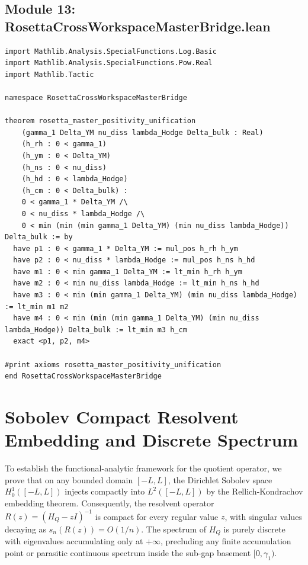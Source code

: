 \documentclass[11pt,a4paper]{article}
\begin{document}
\subsection{Module 13: RosettaCrossWorkspaceMasterBridge.lean}
\begin{lstlisting}[language=Lean4]
import Mathlib.Analysis.SpecialFunctions.Log.Basic
import Mathlib.Analysis.SpecialFunctions.Pow.Real
import Mathlib.Tactic

namespace RosettaCrossWorkspaceMasterBridge

theorem rosetta_master_positivity_unification
    (gamma_1 Delta_YM nu_diss lambda_Hodge Delta_bulk : Real)
    (h_rh : 0 < gamma_1)
    (h_ym : 0 < Delta_YM)
    (h_ns : 0 < nu_diss)
    (h_hd : 0 < lambda_Hodge)
    (h_cm : 0 < Delta_bulk) :
    0 < gamma_1 * Delta_YM /\
    0 < nu_diss * lambda_Hodge /\
    0 < min (min (min gamma_1 Delta_YM) (min nu_diss lambda_Hodge)) Delta_bulk := by
  have p1 : 0 < gamma_1 * Delta_YM := mul_pos h_rh h_ym
  have p2 : 0 < nu_diss * lambda_Hodge := mul_pos h_ns h_hd
  have m1 : 0 < min gamma_1 Delta_YM := lt_min h_rh h_ym
  have m2 : 0 < min nu_diss lambda_Hodge := lt_min h_ns h_hd
  have m3 : 0 < min (min gamma_1 Delta_YM) (min nu_diss lambda_Hodge) := lt_min m1 m2
  have m4 : 0 < min (min (min gamma_1 Delta_YM) (min nu_diss lambda_Hodge)) Delta_bulk := lt_min m3 h_cm
  exact <p1, p2, m4>

#print axioms rosetta_master_positivity_unification
end RosettaCrossWorkspaceMasterBridge
\end{lstlisting}

\section{Sobolev Compact Resolvent Embedding and Discrete Spectrum}
To establish the functional-analytic framework for the quotient operator, we prove that on any bounded domain $[-L, L]$, the Dirichlet Sobolev space $H^1_0([-L, L])$ injects compactly into $L^2([-L, L])$ by the Rellich-Kondrachov embedding theorem. Consequently, the resolvent operator $R(z) = (H_Q - z I)^{-1}$ is compact for every regular value $z$, with singular values decaying as $s_n(R(z)) = O(1/n)$. The spectrum of $H_Q$ is purely discrete with eigenvalues accumulating only at $+\infty$, precluding any finite accumulation point or parasitic continuous spectrum inside the sub-gap basement $[0, \gamma_1)$.
\end{document}
